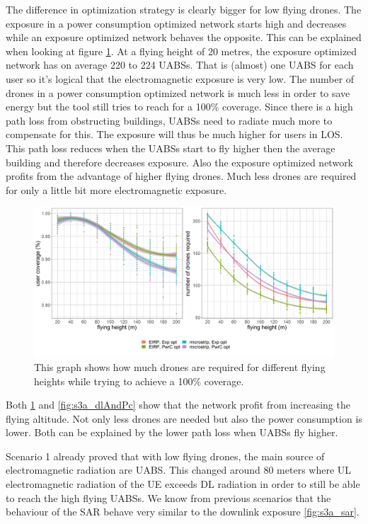 The difference in optimization strategy is clearly bigger for low flying drones. The exposure in a power consumption  optimized network starts high and 
decreases while an exposure optimized network behaves the opposite. This can be explained when looking at figure \ref{fig:s3a_numDronesAndCov}.
At a flying height of 20 metres, the exposure optimized network has on average 220 to 224 \gls{UABS}s. That is (almost) one \gls{UABS} for each user
so it's logical that the electromagnetic exposure is very low.
The number of drones in a power consumption optimized network is much less in order to save energy but the tool still tries to reach for a 100\% coverage. Since 
there is a high path loss from obstructing buildings, \gls{UABS}s need to radiate much more to compensate for this. The exposure will thus be much higher for 
users in \gls{LOS}. This path loss reduces when the \gls{UABS}s start to fly higher then the average  building and therefore decreases exposure.
Also the exposure optimized network profits from the advantage of higher flying drones. Much less drones are required for only a little bit more 
electromagnetic exposure.

\begin{figure}[]
  \includegraphics[width=\textwidth]{../results/s3/fhvsnumdronesAndCov.png}
  \caption{This graph shows how much drones are required for different flying heights while trying to achieve a 100\% coverage.}
  \label{fig:s3a_numDronesAndCov}
\end{figure}

Both \ref{fig:s3a_numDronesAndCov} and \ref{fig:s3a_dlAndPc} show that the network profit from increasing the flying altitude. 
Not only less drones are needed but also the power consumption is lower. Both can be explained by the lower path loss when \gls{UABS}s fly higher.

Scenario 1 already proved that with low flying drones, the main source of electromagnetic radiation are \gls{UABS}. 
This changed around 80 meters where \gls{UL} electromagnetic radiation of the \gls{UE}
 exceeds \gls{DL} radiation in order to still be able to reach the high flying \gls{UABS}s. We know from 
 previous scenarios that the behaviour of the \gls{SAR} behave very similar to the downlink exposure \ref{fig:s3a_sar}.

